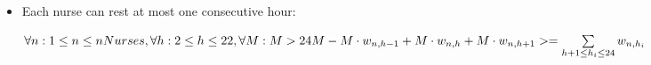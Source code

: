 \documentclass{article}
\begin{document}
\begin{itemize}
\item  Each nurse can rest at most one consecutive hour:

$	
\forall n:  1 \leq n \leq nNurses, \forall h: 2 \leq h \leq 22, \forall M: M > 24  \\ M - M \cdot w_{n,h-1} + M \cdot w_{n,h} + M \cdot w_{n,h+1}  >= \sum\limits_{h+1 \leq h_{i} \leq 24 }  w_{n,h_{i}} 	 $	


\end{itemize}
\end{document}

